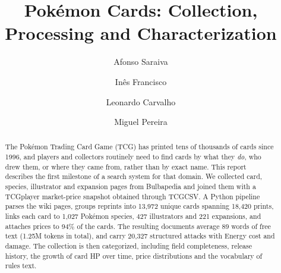 \documentclass[sigconf]{acmart}
\begin{document}

  \title{Pok\'emon Cards: Collection, Processing and Characterization}


  \author{Afonso Saraiva}

  \author{Inês Francisco}

  \author{Leonardo Carvalho}

  \author{Miguel Pereira}

  \renewcommand{\shortauthors}{Saraiva et al.}


  \begin{abstract}
  The Pok\'emon Trading Card Game (TCG) has printed tens of thousands of cards
  since 1996, and players and collectors routinely need to find cards by what
  they \emph{do}, who drew them, or where they came from, rather than by exact
  name. This report describes the first milestone of a search system for that
  domain. We collected card, species, illustrator and expansion pages from
  Bulbapedia and joined them with a TCGplayer market-price snapshot obtained
  through TCGCSV. A Python pipeline parses the wiki pages, groups reprints into
  13{,}972 unique cards spanning 18{,}420 prints, links each card to 1{,}027
  Pok\'emon species, 427 illustrators and 221 expansions, and attaches prices to
  94\% of the cards. The resulting documents average 89 words of free text
  (1.25M tokens in total), and carry 20{,}327 structured attacks with
  Energy cost and damage. The collection is then categorized, including field
  completeness, release history, the growth of card HP over time, price
  distributions and the vocabulary of rules text.
  \end{abstract}
\end{document}
